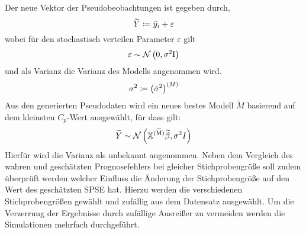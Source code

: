         Der neue Vektor der Pseudobeobachtungen ist gegeben durch,
        \[
            \widetilde{Y} \coloneqq \widetilde{y}_i + \varepsilon
        \]
        wobei für den stochastisch verteilen Parameter $\varepsilon$ gilt
        \[
            \varepsilon \sim \mathcal{N} \left( 0,\sigma^2\mathrm{I} \right)
        \]
        und als Varianz die Varianz des Modells angenommen wird.
        \[
            \sigma^2 \coloneqq \left( \tilde{\sigma}^2 \right)^{(M)}
        \]
        Aus den generierten Pseudodaten wird ein neues bestes Modell $\widetilde{M}$ basierend auf dem kleinsten $C_p$-Wert ausgewählt, für dass gilt:
        \[
            \widetilde{Y} \sim \mathcal{N} \left( \mathbb{X}^{\mathrm{(\widetilde{M})}}\widetilde{\beta}, \sigma^2 I \right)
        \]
        Hierfür wird die Varianz als unbekannt angenommen.
        Neben dem Vergleich des wahren und geschätzten Prognosefehlers bei gleicher Stichprobengröße soll zudem überprüft werden welcher Einfluss die Änderung der Stichprobengröße auf den Wert des geschätzten SPSE hat.
        Hierzu werden die verschiedenen Stichprobengrößen gewählt und zufällig aus dem Datensatz ausgewählt.
        Um die Verzerrung der Ergebnisse durch zufällige Ausreißer zu vermeiden werden die Simulationen mehrfach durchgeführt.



